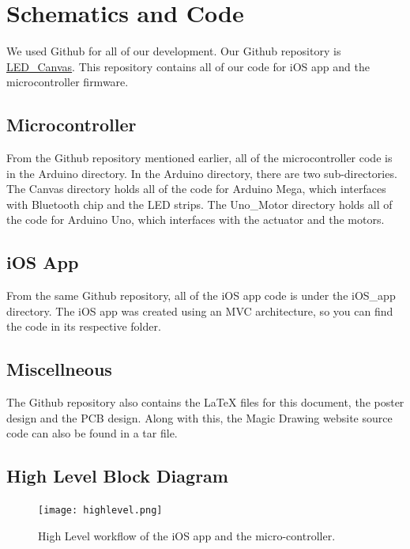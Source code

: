 \documentclass[11pt]{IEEEtran}
\begin{document}
\section{Schematics and Code}
We used Github for all of our development. Our Github repository is \href{https://github.com/rajp20/LED_Canvas}{LED\_Canvas}. This repository contains all of our code for iOS app and the microcontroller firmware.

\subsection{Microcontroller}
From the Github repository mentioned earlier, all of the microcontroller code is in the Arduino directory. In the Arduino directory, there are two sub-directories. The Canvas directory holds all of the code for Arduino Mega, which interfaces with Bluetooth chip and the LED strips. The Uno\_Motor directory holds all of the code for Arduino Uno, which interfaces with the actuator and the motors. 

\subsection{iOS App}
From the same Github repository, all of the iOS app code is under the iOS\_app directory. The iOS app was created using an MVC architecture, so you can find the code in its respective folder. 

\subsection{Miscellneous}
The Github repository also contains the \LaTeX{} files for this document, the poster design and the PCB design. Along with this, the Magic Drawing website source code can also be found in a tar file.

\subsection{High Level Block Diagram}
\begin{figure}[tb]
  \centering
  \texttt{[image: highlevel.png]}
  \caption{High Level workflow of the iOS app and the micro-controller.}
  \label{fig:highlevel}
\end{figure}
\end{document}
